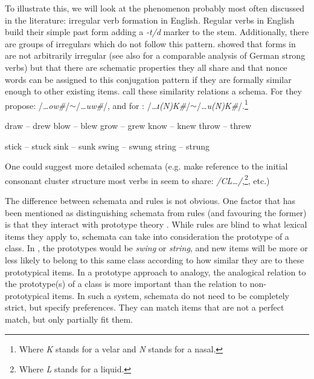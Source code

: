 To illustrate this, we will look at the phenomenon probably most often discussed in the literature: irregular verb formation in English. Regular verbs in English build their simple past form adding a \textit{-t/d} marker to the stem. Additionally, there are groups of irregulars which do not follow this pattern. \textcite{Bybee.1982} showed that forms in  are not arbitrarily irregular (see also \textcite{Kopcke.1998a} for a comparable analysis of German strong verbs) but that there are schematic properties they all share and that nonce words can be assigned to this conjugation pattern if they are formally similar enough to other existing items. \textcite{Bybee.1982} call these similarity relations a schema. For  they propose: /\textit{\dots ow\#}/$\sim$/\textit{\dots uw\#}/, and for : /\textit{\dots ɪ(N)K\#}/$\sim$/\textit{\dots u(N)K\#}/.\footnote{Where \textit{K} stands for a velar and \textit{N} stands for a nasal.}

\begin{exe}
    \ex \label{ex-past-ew}
    \begin{xlist}
        \ex draw -- drew
        \ex blow -- blew
        \ex grow -- grew
        \ex know -- knew
        \ex throw -- threw
    \end{xlist}

    \ex \label{ex-past-nk}
    \begin{xlist}
        \ex stick -- stuck
        \ex sink -- sunk
        \ex swing -- swung
        \ex string -- strung
    \end{xlist}
\end{exe}

One could suggest more detailed schemata (e.g. make reference to the initial consonant cluster structure most verbs in  seem to share: \textit{/CL\dots/},\footnote{Where \textit{L} stands for a liquid.}, etc.)

The difference between schemata and rules is not obvious. One factor that has been mentioned as distinguishing schemata from rules (and favouring the former) is that they interact with prototype theory \autocite{Kopcke.1998a}. While rules are blind to what lexical items they apply to, schemata can take into consideration the prototype of a class. In , the prototypes would be \textit{swing} or \textit{string}, and new items will be more or less likely to belong to this same class according to how similar they are to these prototypical items. In a prototype approach to analogy, the analogical relation to the prototype(s) of a class is more important than the relation to non-prototypical items. In such a system, schemata do not need to be completely strict, but specify preferences. They can match items that are not a perfect match, but only partially fit them.

